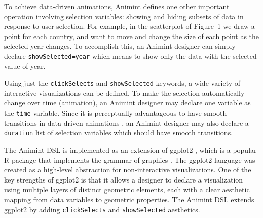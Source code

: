 \documentclass[10pt,journal,compsoc]{IEEEtran}\usepackage[]{graphicx}\usepackage[]{color}
\begin{document}
To achieve data-driven animations, Animint defines one other important
operation involving selection variables: showing and hiding subsets of
data in response to user selection. For example, in the scatterplot of Figure~1 we draw a point for
each country, and want to move and change the size of each point as
the selected year changes. To accomplish this, an Animint designer can
simply declare \texttt{showSelected=year} which means to show only the
data with the selected value of year.

Using just the \texttt{clickSelects} and \texttt{showSelected}
keywords, a wide variety of interactive visualizations can be
defined. To make the selection automatically change over time
(animation), an Animint designer may declare one variable as the
\texttt{time} variable. Since it is perceptually advantageous to have
smooth transitions in data-driven animations
\citep{animated-transitions}, an Animint designer may also declare a
\texttt{duration} list of selection variables which should have smooth
transitions.

The Animint DSL is implemented as an extension of ggplot2
\citep{ggplot2-book, ggplot2-paper}, which is a popular R package that
implements the grammar of graphics \citep{wilkinson}. The ggplot2
language was created as a high-level abstraction for non-interactive
visualizations. One of the key strengths of ggplot2 is that it allows
a designer to declare a visualization using multiple layers of
distinct geometric elements, each with a clear aesthetic mapping from
data variables to geometric properties. The Animint DSL extends
ggplot2 by adding \texttt{clickSelects} and \texttt{showSelected}
aesthetics.
\end{document}
